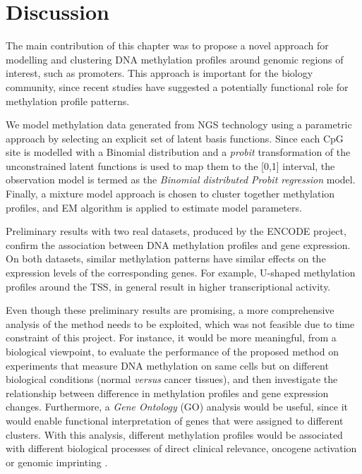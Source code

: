 \section{Discussion} \label{meth-discussion-sect}
The main contribution of this chapter was to propose a novel approach for modelling and clustering DNA methylation profiles around genomic regions of interest, such as promoters. This approach is important for the biology community, since recent studies have suggested a potentially functional role for methylation profile patterns.

We model methylation data generated from NGS technology using a parametric approach by selecting an explicit set of latent basis functions. Since each CpG site is modelled with a Binomial distribution and a \emph{probit} transformation of the unconstrained latent functions is used to map them to the [0,1] interval, the observation model is termed as the \emph{Binomial distributed Probit regression} model. Finally, a mixture model approach is chosen to cluster together methylation profiles, and EM algorithm is applied to estimate model parameters. 

Preliminary results with two real datasets, produced by the ENCODE project, confirm the association between DNA methylation profiles and gene expression. On both datasets, similar methylation patterns have similar effects on the expression levels of the corresponding genes. For example, U-shaped methylation profiles around the TSS, in general result in higher transcriptional activity. 

Even though these preliminary results are promising, a more comprehensive analysis of the method needs to be exploited, which was not feasible due to time constraint of this project. For instance, it would be more meaningful, from a biological viewpoint, to evaluate the performance of the proposed method on experiments that measure DNA methylation on same cells but on different biological conditions (\eg normal \emph{versus} cancer tissues), and then investigate the relationship between difference in methylation profiles and gene expression changes. Furthermore, a \emph{Gene Ontology} (GO) \citep{Ashburner2000} analysis would be useful, since it would enable functional interpretation of genes that were assigned to different clusters. With this analysis, different methylation profiles would be associated with different biological processes of direct clinical relevance, \eg oncogene activation or genomic imprinting \citep{Li1993}. 

